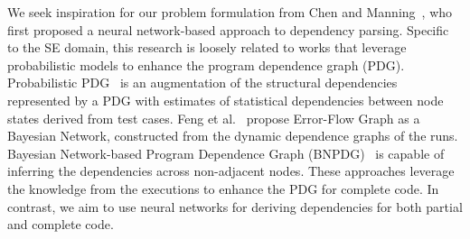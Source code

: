 We seek inspiration for our problem formulation from Chen and Manning~\cite{chen-manning-2014-fast}, who first proposed a neural network-based approach to dependency parsing. 
Specific to the SE domain, this research is loosely related to works that leverage probabilistic models to enhance the program dependence graph (PDG).
Probabilistic PDG~\cite{baah-issta08-probabilistic} is an augmentation of the structural dependencies represented by a PDG with estimates of statistical dependencies between node states derived from test cases. 
Feng et al.~\cite{feng-paste10} propose Error-Flow Graph as a Bayesian Network, constructed from the dynamic dependence graphs of the runs. 
Bayesian Network-based Program Dependence Graph (BNPDG)~\cite{yu-jss17-bayesian} is capable of inferring the dependencies across non-adjacent nodes. 
These approaches leverage the knowledge from the executions to enhance the PDG for complete code. In contrast, we aim to use neural networks for deriving dependencies for both partial and complete code.
